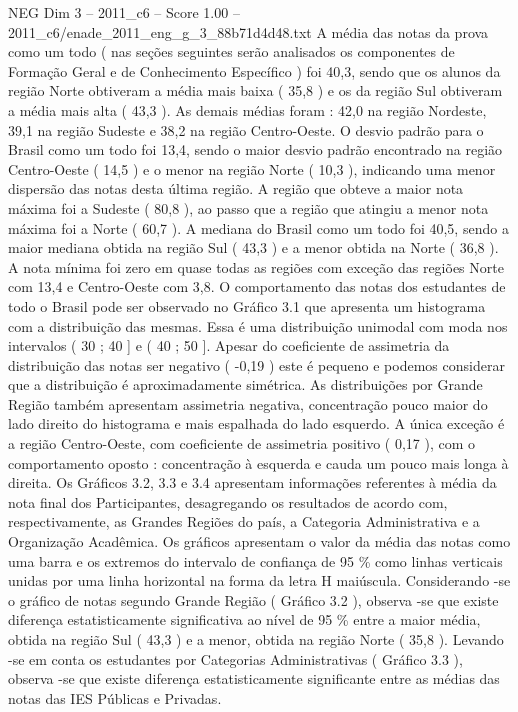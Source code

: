\begin{textsample}{NEG Dim 3 – 2011\_c6 – Score 1.00 – 2011\_c6/enade\_2011\_eng\_g\_3\_88b71d4d48.txt}
A média das notas da prova como um todo ( nas seções seguintes serão analisados os componentes de Formação Geral e de Conhecimento Específico ) foi 40,3, sendo que os alunos da região Norte obtiveram a média mais baixa ( 35,8 ) e os da região Sul obtiveram a média mais alta ( 43,3 ).
As demais médias foram : 42,0 na região Nordeste, 39,1 na região Sudeste e 38,2 na região Centro-Oeste.
O desvio padrão para o Brasil como um todo foi 13,4, sendo o maior desvio padrão encontrado na região Centro-Oeste ( 14,5 ) e o menor na região Norte ( 10,3 ), indicando uma menor dispersão das notas desta última região.
A região que obteve a maior nota máxima foi a Sudeste ( 80,8 ), ao passo que a região que atingiu a menor nota máxima foi a Norte ( 60,7 ).
A mediana do Brasil como um todo foi 40,5, sendo a maior mediana obtida na região Sul ( 43,3 ) e a menor obtida na Norte ( 36,8 ).
A nota mínima foi zero em quase todas as regiões com exceção das regiões Norte com 13,4 e Centro-Oeste com 3,8.
O comportamento das notas dos estudantes de todo o Brasil pode ser observado no Gráfico 3.1 que apresenta um histograma com a distribuição das mesmas.
Essa é uma distribuição unimodal com moda nos intervalos ( 30 ; 40 ] e ( 40 ; 50 ].
Apesar do coeficiente de assimetria da distribuição das notas ser negativo ( -0,19 ) este é pequeno e podemos considerar que a distribuição é aproximadamente simétrica.
As distribuições por Grande Região também apresentam assimetria negativa, concentração pouco maior do lado direito do histograma e mais espalhada do lado esquerdo.
A única exceção é a região Centro-Oeste, com coeficiente de assimetria positivo ( 0,17 ), com o comportamento oposto : concentração à esquerda e cauda um pouco mais longa à direita.
Os Gráficos 3.2, 3.3 e 3.4 apresentam informações referentes à média da nota final dos Participantes, desagregando os resultados de acordo com, respectivamente, as Grandes Regiões do país, a Categoria Administrativa e a Organização Acadêmica.
Os gráficos apresentam o valor da média das notas como uma barra e os extremos do intervalo de confiança de 95 \% como linhas verticais unidas por uma linha horizontal na forma da letra H maiúscula.
Considerando -se o gráfico de notas segundo Grande Região ( Gráfico 3.2 ), observa -se que existe diferença estatisticamente significativa ao nível de 95 \% entre a maior média, obtida na região Sul ( 43,3 ) e a menor, obtida na região Norte ( 35,8 ).
Levando -se em conta os estudantes por Categorias Administrativas ( Gráfico 3.3 ), observa -se que existe diferença estatisticamente significante entre as médias das notas das IES Públicas e Privadas.

\end{textsample}
